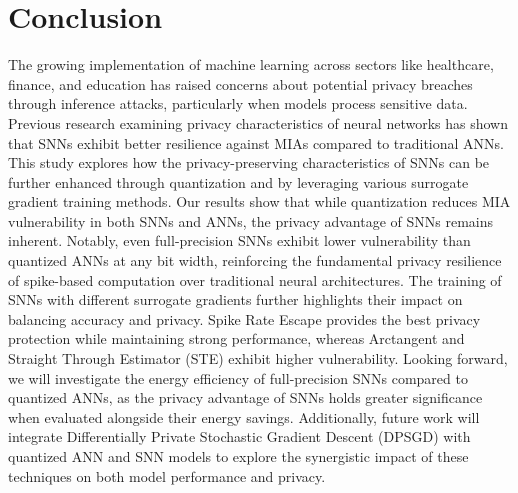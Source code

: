 \section{Conclusion}
\noindent
 The growing implementation of machine learning across sectors like healthcare, finance, and education has raised concerns about potential privacy breaches through inference attacks, particularly when models process sensitive data. Previous research examining privacy characteristics of neural networks has shown that SNNs exhibit better resilience against MIAs compared to traditional ANNs. This study explores how the privacy-preserving characteristics of SNNs can be further enhanced through quantization and by leveraging various surrogate gradient training methods. Our results show that while quantization reduces MIA vulnerability in both SNNs and ANNs,  the privacy advantage of SNNs remains inherent. Notably, even full-precision SNNs exhibit lower vulnerability than quantized ANNs at any bit width, reinforcing the fundamental privacy resilience of spike-based computation over traditional neural architectures. The training of SNNs with different surrogate gradients further highlights their impact on balancing accuracy and privacy. Spike Rate Escape provides the best privacy protection while maintaining strong performance, whereas Arctangent and Straight Through
Estimator (STE) exhibit higher vulnerability. 
Looking forward, we will investigate the energy efficiency of full-precision SNNs compared to quantized ANNs, as the privacy advantage of SNNs holds greater significance when evaluated alongside their energy savings. Additionally, future work will integrate Differentially Private Stochastic Gradient Descent (DPSGD) with quantized ANN and SNN models to explore the synergistic impact of these techniques on both model performance and privacy.
 
 
 
 
 
 
 
 
